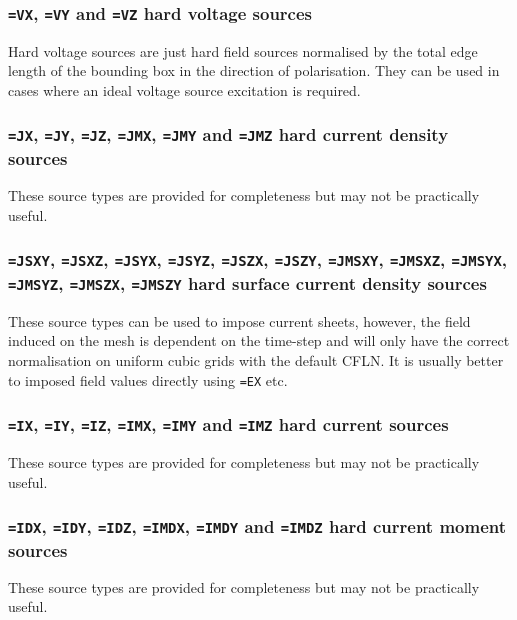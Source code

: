 \documentclass[onecolumn,a4paper]{article}
\numberwithin{equation}{section}
\begin{document}
\subsubsection{\texttt{=VX}, \texttt{=VY} and \texttt{=VZ} hard voltage sources}

Hard voltage sources are just hard field sources normalised by the total edge length of 
the bounding box in the direction of polarisation. They can be used in cases where
an ideal voltage source excitation is required.

\subsubsection{\texttt{=JX}, \texttt{=JY}, \texttt{=JZ}, \texttt{=JMX}, \texttt{=JMY} and \texttt{=JMZ} hard 
current density sources}

These source types are provided for completeness but may not be practically useful.

\subsubsection{\texttt{=JSXY}, \texttt{=JSXZ}, \texttt{=JSYX}, \texttt{=JSYZ}, \texttt{=JSZX}, \texttt{=JSZY},
\texttt{=JMSXY}, \texttt{=JMSXZ}, \texttt{=JMSYX}, \texttt{=JMSYZ}, \texttt{=JMSZX}, \texttt{=JMSZY} hard surface current density sources}

These source types can be used to impose current sheets, however, the field induced on the mesh is dependent on the
time-step and will only have the correct normalisation on uniform cubic grids with the default CFLN. It is usually
better to imposed field values directly using \texttt{=EX} etc.

\subsubsection{\texttt{=IX}, \texttt{=IY}, \texttt{=IZ}, \texttt{=IMX}, \texttt{=IMY} and \texttt{=IMZ} hard 
current sources}

These source types are provided for completeness but may not be practically useful.

\subsubsection{\texttt{=IDX}, \texttt{=IDY}, \texttt{=IDZ}, \texttt{=IMDX}, \texttt{=IMDY} and \texttt{=IMDZ} hard 
current moment sources}

These source types are provided for completeness but may not be practically useful.
\end{document}
